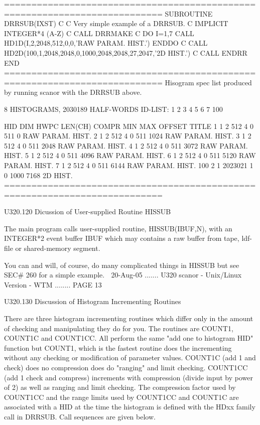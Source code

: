    ===========================================================================
         SUBROUTINE DRRSUB(IXST)
   C
   C     Very simple example of a DRRSUB.
   C
         IMPLICIT INTEGER*4 (A-Z)
   C
         CALL DRRMAKE
   C
         DO I=1,7
         CALL HD1D(I,2,2048,512,0,0,'RAW PARAM. HIST.')
         ENDDO
   C
         CALL HD2D(100,1,2048,2048,0,1000,2048,2048,27,2047,'2D HIST.')
   C
         CALL ENDRR
         END
   ===========================================================================
   Hisogram spec list produced by running scanor with the DRRSUB above.
 
              8 HISTOGRAMS,      2030189 HALF-WORDS
    ID-LIST:
          1       2       3       4       5       6       7     100
 
     HID  DIM HWPC  LEN(CH)   COMPR  MIN   MAX   OFFSET    TITLE
       1    1   2      512       4     0   511        0  RAW PARAM. HIST.
       2    1   2      512       4     0   511     1024  RAW PARAM. HIST.
       3    1   2      512       4     0   511     2048  RAW PARAM. HIST.
       4    1   2      512       4     0   511     3072  RAW PARAM. HIST.
       5    1   2      512       4     0   511     4096  RAW PARAM. HIST.
       6    1   2      512       4     0   511     5120  RAW PARAM. HIST.
       7    1   2      512       4     0   511     6144  RAW PARAM. HIST.
     100    2   1  2023021       1     0  1000     7168  2D HIST.
   ===========================================================================
 
 
 
   U320.120  Dicussion of User-supplied Routine HISSUB
 
   The  main  program  calls  user-supplied  routine,  HISSUB(IBUF,N), with an
   INTEGER*2 event buffer IBUF which may contains  a  raw  buffer  from  tape,
   ldf-file or shared-memory segment.
 
   You  can  and will, of course, do many complicated things in HISSUB but see
   SEC# 260 for a simple example.
    
   20-Aug-05 ....... U320  scanor - Unix/Linux Version - WTM ........ PAGE  13
 
 
   U320.130  Discussion of Histogram Incrementing Routines
 
   There are three histogram incrementing routines which differ  only  in  the
   amount  of  checking  and  manipulating  they  do for you. The routines are
   COUNT1, COUNT1C and COUNT1CC. All perform the same "add  one  to  histogram
   HID"  function  but  COUNT1,  which  is  the  fastest  routine   does   the
   incrementing  without  any  checking  or  modification of parameter values.
   COUNT1C (add 1 and check) does no compression does do "ranging"  and  limit
   checking.  COUNT1CC  (add 1 check and compress) increments with compression
   (divide input by power of 2) as well as ranging  and  limit  checking.  The
   compression  factor  used by COUNT1CC and the range limits used by COUNT1CC
   and COUNT1C are associated with a HID at the time the histogram is  defined
   with the HDxx family call in DRRSUB. Call sequences are given below.
 
